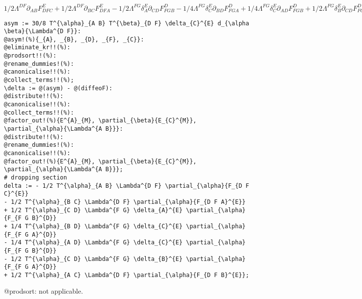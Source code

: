 \documentclass[11pt]{article}
\begin{document}
$1/2 \Lambda^{D F} \partial_{A B}{F_{D F C}^{E}} + 1/2 \Lambda^{D F} \partial_{B C}{F_{D F A}^{E}} - 1/2 \Lambda^{F G} \delta_{A}^{E} \partial_{C D}{F_{F G B}^{D}} - 1/4 \Lambda^{F G} \delta_{C}^{E} \partial_{B D}{F_{F G A}^{D}} + 1/4 \Lambda^{F G} \delta_{C}^{E} \partial_{A D}{F_{F G B}^{D}} + 1/2 \Lambda^{F G} \delta_{B}^{E} \partial_{C D}{F_{F G A}^{D}} - 1/2 \Lambda^{D F} \partial_{A C}{F_{D F B}^{E}} - F_{B G C}^{E} F_{D F A}^{G} \Lambda^{D F} + F_{A G C}^{E} F_{D F B}^{G} \Lambda^{D F} + F_{A B G}^{E} F_{D F C}^{G} \Lambda^{D F} - F_{A B C}^{D} F_{F G D}^{E} \Lambda^{F G}$
{\color[named]{Blue}\begin{verbatim}
asym := 30/8 T^{\alpha}_{A B} T^{\beta}_{D F} \delta_{C}^{E} d_{\alpha \beta}{\Lambda^{D F}}:
@asym!(%){_{A}, _{B}, _{D}, _{F}, _{C}}:
@eliminate_kr!!(%):
@prodsort!!(%):
@rename_dummies!(%):
@canonicalise!!(%):
@collect_terms!!(%);
\delta := @(asym) - @(diffeoF):
@distribute!!(%):
@canonicalise!!(%):
@collect_terms!!(%):
@factor_out!(%){E^{A}_{M}, \partial_{\beta}{E_{C}^{M}}, \partial_{\alpha}{\Lambda^{A B}}}:
@distribute!!(%):
@rename_dummies!(%):
@canonicalise!!(%):
@factor_out!(%){E^{A}_{M}, \partial_{\beta}{E_{C}^{M}}, \partial_{\alpha}{\Lambda^{A B}}};
# dropping section
delta := - 1/2 T^{\alpha}_{A B} \Lambda^{D F} \partial_{\alpha}{F_{D F C}^{E}}
- 1/2 T^{\alpha}_{B C} \Lambda^{D F} \partial_{\alpha}{F_{D F A}^{E}}
+ 1/2 T^{\alpha}_{C D} \Lambda^{F G} \delta_{A}^{E} \partial_{\alpha}{F_{F G B}^{D}} 
+ 1/4 T^{\alpha}_{B D} \Lambda^{F G} \delta_{C}^{E} \partial_{\alpha}{F_{F G A}^{D}} 
- 1/4 T^{\alpha}_{A D} \Lambda^{F G} \delta_{C}^{E} \partial_{\alpha}{F_{F G B}^{D}} 
- 1/2 T^{\alpha}_{C D} \Lambda^{F G} \delta_{B}^{E} \partial_{\alpha}{F_{F G A}^{D}} 
+ 1/2 T^{\alpha}_{A C} \Lambda^{D F} \partial_{\alpha}{F_{D F B}^{E}};
\end{verbatim}}
@prodsort: not applicable.
\end{document}
